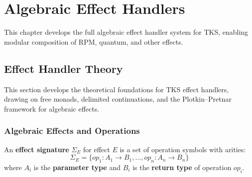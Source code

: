 \chapter{Algebraic Effect Handlers}
\label{ch:effect-handlers}

\begin{tcolorbox}[colback=blue!5!white,colframe=blue!75!black,title=\vnewthree]
This chapter develops the full algebraic effect handler system for TKS, enabling modular composition of RPM, quantum, and other effects.
\end{tcolorbox}

\section{Effect Handler Theory}
\label{sec:effect-handler-theory}

This section develops the theoretical foundations for TKS effect handlers, drawing on free monads, delimited continuations, and the Plotkin--Pretnar framework for algebraic effects.

\subsection{Algebraic Effects and Operations}
\label{subsec:algebraic-effects}

\begin{definition}
\label{def:effect-signature}
An \textbf{effect signature} $\Sigma_E$ for effect $E$ is a set of operation symbols with arities:
\[
\Sigma_E = \{\mathit{op}_1 : A_1 \to B_1, \ldots, \mathit{op}_n : A_n \to B_n\}
\]
where $A_i$ is the \textbf{parameter type} and $B_i$ is the \textbf{return type} of operation $\mathit{op}_i$.
\end{definition}

